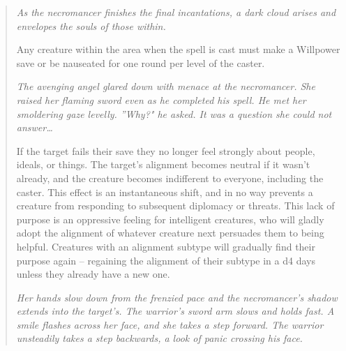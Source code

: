 \begin{quote}

\begin{small}
\end{small}
\emph{As the necromancer finishes the final incantations, a dark cloud arises and envelopes the souls of those within.}

Any creature within the area when the spell is cast must make a Willpower save or be nauseated for one round per level of the caster.\\

\begin{small}
\end{small}
\emph{The avenging angel glared down with menace at the necromancer. She raised her flaming sword even as he completed his spell. He met her smoldering gaze levelly. ''Why?" he asked. It was a question she could not answer\ldots}

If the target fails their save they no longer feel strongly about people, ideals, or things. The target's alignment becomes neutral if it wasn't already, and the creature becomes indifferent to everyone, including the caster. This effect is an instantaneous shift, and in no way prevents a creature from responding to subsequent diplomacy or threats. This lack of purpose is an oppressive feeling for intelligent creatures, who will gladly adopt the alignment of whatever creature next persuades them to being helpful. Creatures with an alignment subtype will gradually find their purpose again -- regaining the alignment of their subtype in a d4 days unless they already have a new one.\\

\begin{small}
\end{small}
\emph{Her hands slow down from the frenzied pace and the necromancer's shadow extends into the target's. The warrior's sword arm slows and holds fast. A smile flashes across her face, and she takes a step forward. The warrior unsteadily takes a step backwards, a look of panic crossing his face.}


\end{quote}
